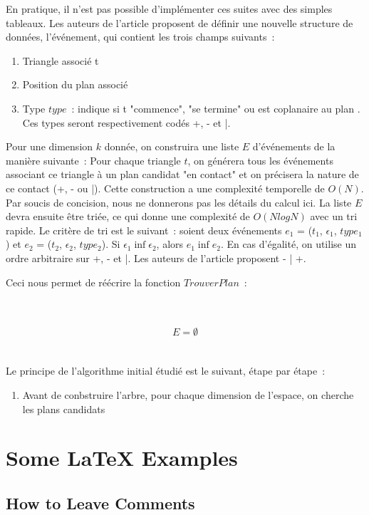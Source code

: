 \documentclass[a4paper]{article}
\begin{document}
En pratique, il n'est pas possible d'implémenter ces suites avec des simples tableaux. Les auteurs de l'article proposent de définir une nouvelle structure de données, l'événement, qui contient les trois champs suivants~:
\begin{enumerate}
	\item Triangle associé t
	\item Position du plan associé \epsilon
	\item Type $type$~: indique si t "commence", "se termine" ou est coplanaire au plan \epsilon. Ces types seront respectivement codés +, - et |.
\end{enumerate}

Pour une dimension $k$ donnée, on construira une liste $E$ d'événements de la manière suivante~: Pour chaque triangle $t$, on générera tous les événements associant ce triangle à un plan candidat "en contact" et on précisera la nature de ce contact (+, - ou |). Cette construction a une complexité temporelle de $O(N)$. Par soucis de concision, nous ne donnerons pas les détails du calcul ici. La liste $E$ devra ensuite être triée, ce qui donne une complexité de $O(NlogN)$ avec un tri rapide. Le critère de tri est le suivant~: soient deux événements $e_1$ = ($t_1$, $\epsilon_1$, $type_1$) et $e_2$ = ($t_2$, $\epsilon_2$, $type_2$). Si $\epsilon_1 \inf \epsilon_2$, alors $e_1 \inf e_2$. En cas d'égalité, on utilise un ordre arbitraire sur +, - et |. Les auteurs de l'article proposent - \inf | \inf +.

Ceci nous permet de réécrire la fonction $TrouverPlan$~:

\\\\
$$E = \emptyset
  $$
\\\\

Le principe de l'algorithme initial étudié est le suivant, étape par étape~:
\begin{enumerate}
	\item Avant de conbstruire l'arbre, pour chaque dimension de l'espace, on cherche les plans candidats
\end{enumerate}

\section{Some \LaTeX{} Examples}
\label{sec:examples}

\subsection{How to Leave Comments}
\end{document}
